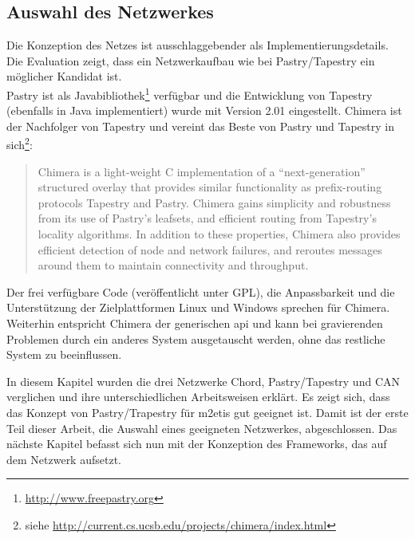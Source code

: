 \subsection*{Auswahl des Netzwerkes}
Die Konzeption des Netzes ist ausschlaggebender als Implementierungsdetails. Die Evaluation zeigt, dass ein Netzwerkaufbau wie bei Pastry/Tapestry  ein möglicher Kandidat ist.\\
Pastry ist als Javabibliothek\footnote{\url{http://www.freepastry.org}} verfügbar und die Entwicklung von Tapestry (ebenfalls in Java implementiert) wurde mit Version 2.01 eingestellt. Chimera \cite{Allen2006Chimera} ist der Nachfolger von Tapestry und vereint das Beste von Pastry und Tapestry in sich\footnote{siehe \url{http://current.cs.ucsb.edu/projects/chimera/index.html}}: 
\begin{quote}
Chimera is a light-weight C implementation of a ``next-generation'' structured overlay that provides similar functionality as prefix-routing protocols Tapestry and Pastry.  Chimera gains simplicity and robustness from its use of Pastry's leafsets, and efficient routing from Tapestry's locality algorithms.  In addition to these properties, Chimera also provides efficient detection of node and network failures, and reroutes messages around them to maintain connectivity and throughput.  
\end{quote}

Der frei verfügbare Code (veröffentlicht unter GPL), die Anpassbarkeit und die Unterstützung der Zielplattformen Linux und Windows sprechen für Chimera. Weiterhin entspricht Chimera der generischen \ac{api} und kann bei gravierenden Problemen durch ein anderes System ausgetauscht werden, ohne das restliche System zu beeinflussen.

In diesem Kapitel wurden die drei Netzwerke Chord, Pastry/Tapestry und CAN verglichen und ihre unterschiedlichen Arbeitsweisen erklärt. Es zeigt sich, dass das Konzept von Pastry/Trapestry für \ac{m2etis} gut geeignet ist. Damit ist der erste Teil dieser Arbeit, die Auswahl eines geeigneten Netzwerkes, abgeschlossen. Das nächste Kapitel befasst sich nun mit der Konzeption des Frameworks, das auf dem Netzwerk aufsetzt.
